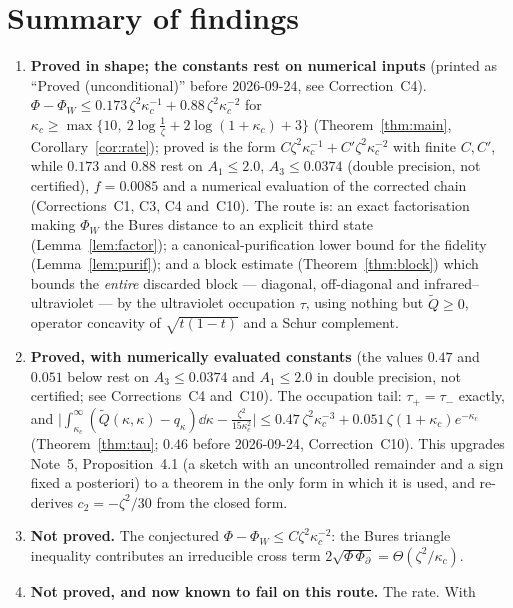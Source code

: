 \documentclass[11pt]{article}
\begin{document}
\section{Summary of findings}\label{sec:findings}

\begin{enumerate}[leftmargin=1.6em]
\item \textbf{Proved in shape; the constants rest on numerical inputs} (printed as ``Proved (unconditional)'' before 2026-09-24, see Correction~C4).  $\Phi-\Phi_W\le0.173\,\zeta^2\kappa_c^{-1}+0.88\,\zeta^2\kappa_c^{-2}$
for $\kappa_c\ge\max\{10,\ 2\log\frac1\zeta+2\log(1+\kappa_c)+3\}$ (Theorem~\ref{thm:main},
Corollary~\ref{cor:rate}); proved is the form $C\zeta^2\kappa_c^{-1}+C'\zeta^2\kappa_c^{-2}$ with finite $C,C'$, while $0.173$ and $0.88$ rest on $A_1\le2.0$, $A_3\le0.0374$ (double precision, not certified), $f=0.0085$ and a numerical evaluation of the corrected chain (Corrections~C1, C3, C4 and~C10).  The route is: an exact factorisation making $\Phi_W$ the Bures distance to
an explicit third state (Lemma~\ref{lem:factor}); a canonical-purification lower bound for the
fidelity (Lemma~\ref{lem:purif}); and a block estimate (Theorem~\ref{thm:block}) which bounds the
\emph{entire} discarded block --- diagonal, off-diagonal and infrared--ultraviolet --- by the
ultraviolet occupation $\tau$, using nothing but $\widetilde Q\ge0$, operator concavity of
$\sqrt{t(1-t)}$ and a Schur complement.
\item \textbf{Proved, with numerically evaluated constants} (the values $0.47$ and $0.051$ below rest on $A_3\le0.0374$ and $A_1\le2.0$ in double precision, not certified; see Corrections~C4 and~C10).  The occupation tail: $\tau_+=\tau_-$ exactly, and
$\bigl|\int_{\kappa_c}^\infty(\widetilde Q(\kappa,\kappa)-q_\kappa)\dd\kappa-\frac{\zeta^2}{15\kappa_c^2}\bigr|
\le0.47\,\zeta^2\kappa_c^{-3}+0.051\,\zeta(1+\kappa_c)e^{-\kappa_c}$ (Theorem~\ref{thm:tau}; $0.46$ before 2026-09-24, Correction~C10).  This
upgrades Note~5, Proposition~4.1 (a sketch with an uncontrolled remainder and a sign fixed a
posteriori) to a theorem in the only form in which it is used, and re-derives $c_2=-\zeta^2/30$ from
the closed form.
\item \textbf{Not proved.}  The conjectured $\Phi-\Phi_W\le C\zeta^2\kappa_c^{-2}$: the Bures triangle
inequality contributes an irreducible cross term $2\sqrt{\Phi\,\Phi_\partial}=\Theta(\zeta^2/\kappa_c)$.
\item \textbf{Not proved, and now known to fail on this route.}  The rate.  With

\end{enumerate}
\end{document}
